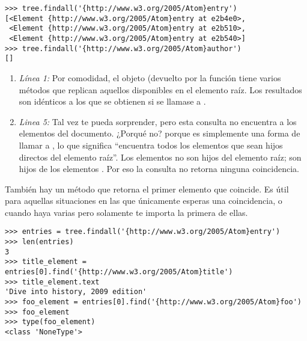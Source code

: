 \noindent\begin{minipage}{\textwidth}
\begin{lstlisting}[mathescape=True]
>>> tree.findall('{http://www.w3.org/2005/Atom}entry')
[<Element {http://www.w3.org/2005/Atom}entry at e2b4e0>,
 <Element {http://www.w3.org/2005/Atom}entry at e2b510>,
 <Element {http://www.w3.org/2005/Atom}entry at e2b540>]
>>> tree.findall('{http://www.w3.org/2005/Atom}author')
[]
\end{lstlisting}
\end{minipage}

\begin{enumerate}

\item \emph{Línea 1:} Por comodidad, el objeto  (devuelto por la función  tiene varios métodos que replican aquellos disponibles en el elemento raíz. Los resultados son idénticos a los que se obtienen si se llamase a .

\item \emph{Linea 5:} Tal vez te pueda sorprender, pero esta consulta no encuentra a los elementos  del documento. ¿Porqué no? porque es simplemente una forma de llamar a , lo que significa ``encuentra todos los elementos  que sean hijos directos del elemento raíz''. Los elementos  no son hijos del elemento raíz; son hijos de los elementos . Por eso la consulta no retorna ninguna coincidencia.

\end{enumerate}

También hay un método  que retorna el primer elemento que coincide. Es útil para aquellas situaciones en las que únicamente esperas una coincidencia, o cuando haya varias pero solamente te importa la primera de ellas.

\noindent\begin{minipage}{\textwidth}
\begin{lstlisting}[mathescape=True]
>>> entries = tree.findall('{http://www.w3.org/2005/Atom}entry')
>>> len(entries)
3
>>> title_element = entries[0].find('{http://www.w3.org/2005/Atom}title')
>>> title_element.text
'Dive into history, 2009 edition'
>>> foo_element = entries[0].find('{http://www.w3.org/2005/Atom}foo')
>>> foo_element
>>> type(foo_element)
<class 'NoneType'>
\end{lstlisting}
\end{minipage}

